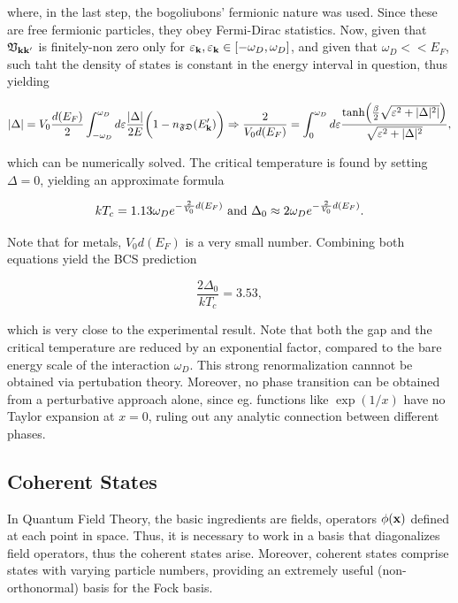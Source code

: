 \documentclass{homework}
\begin{document}
where, in the last step, the bogoliubons' fermionic nature was used. Since these are free fermionic particles, they obey Fermi-Dirac statistics. Now, given that $\mathfrak{V}_{{\bf k}{\bf k}'}$ is finitely-non zero only for $\varepsilon_{{\bf k}}, \varepsilon_{{\bf k}} \in [-\omega_D, \omega_D]$, and given that $\omega_D << E_F$, such taht the density of states is constant in the energy interval in question, thus yielding

\begin{equation}
    |\Delta| = V_0 \frac{d(E_F)}{2} \int_{-\omega_D}^{\omega_D} d \varepsilon \frac{|\Delta|}{2E} \bigg(1 - n_{\mathfrak{F}\mathfrak{D}}(E_{\bf k}') \bigg) \Rightarrow \frac{2}{V_0 d(E_F)} = \int_{0}^{\omega_D} d\varepsilon \frac{\tanh(\frac{\beta}{2} \sqrt{\varepsilon^2+|\Delta|^2|})}{\sqrt{\varepsilon^2 + |\Delta|^2}},
\end{equation}

which can be numerically solved. The critical temperature is found by setting $\Delta = 0$, yielding an approximate formula

$$
    k T_c = 1.13 \omega_D e^{-\frac{2}{V_0} d(E_F)} \textnormal{ and } \Delta_0 \approx 2 \omega_D e^{-\frac{2}{V_0} d(E_F)}.
$$

Note that for metals, $V_0 d(E_F)$ is a very small number. Combining both equations yield the BCS prediction 

$$
\frac{2\Delta_0}{kT_c} = 3.53,
$$

which is very close to the experimental result. Note that both the gap and the critical temperature are reduced by an exponential factor, compared to the bare energy scale of the interaction $\omega_D$. This strong renormalization cannnot be obtained via pertubation theory. Moreover, no phase transition can be obtained from a perturbative approach alone, since eg. functions like $\exp(1/x)$ have no Taylor expansion at $x=0$, ruling out any analytic connection between different phases. 

\clearpage

\subsection{Coherent States}

In Quantum Field Theory, the basic ingredients are fields, operators $\phi({\bf x})$ defined at each point in space. Thus, it is necessary to work in a basis that diagonalizes field operators, thus the coherent states arise. Moreover, coherent states comprise states with varying particle numbers, providing an extremely useful (non-orthonormal) basis for the Fock basis. \\
\end{document}
